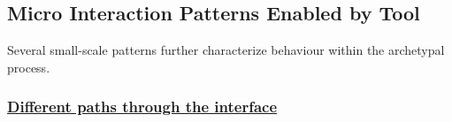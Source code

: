     
    

\subsection{Micro Interaction Patterns Enabled by Tool} 
Several small-scale  patterns further characterize behaviour within the archetypal process.



\subsubsection{\underline{Different paths through the interface}}


